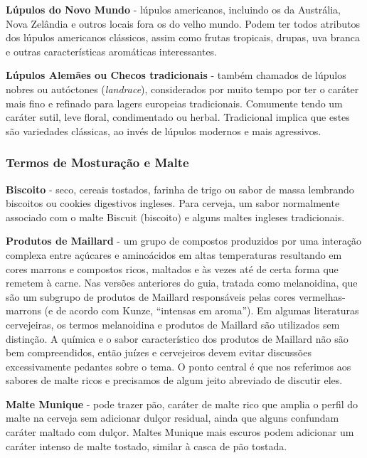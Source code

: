 \textbf{Lúpulos do Novo Mundo} - lúpulos americanos, incluindo os da Austrália, Nova Zelândia e outros locais fora os do velho mundo. Podem ter todos atributos dos lúpulos americanos clássicos, assim como frutas tropicais, drupas, uva branca e outras características aromáticas interessantes.

\textbf{Lúpulos Alemães ou Checos tradicionais} - também chamados de lúpulos nobres ou autóctones (\textit{landrace}), considerados por muito tempo por ter o caráter mais fino e refinado para lagers europeias tradicionais. Comumente tendo um caráter sutil, leve floral, condimentado ou herbal. Tradicional implica que estes são variedades clássicas, ao invés de lúpulos modernos e mais agressivos.

\subsubsection*{Termos de Mosturação e Malte}

\textbf{Biscoito} - seco, cereais tostados, farinha de trigo ou sabor de massa lembrando biscoitos ou cookies digestivos ingleses. Para cerveja, um sabor normalmente associado com o malte Biscuit (biscoito) e alguns maltes ingleses tradicionais.

\textbf{Produtos de Maillard} - um grupo de compostos produzidos por uma interação complexa entre açúcares e aminoácidos em altas temperaturas resultando em cores marrons e compostos ricos, maltados e às vezes até de certa forma que remetem à carne. Nas versões anteriores do guia, tratada como melanoidina, que são um subgrupo de produtos de Maillard responsáveis pelas cores vermelhas-marrons (e de acordo com Kunze, “intensas em aroma”). Em algumas literaturas cervejeiras, os termos melanoidina e produtos de Maillard são utilizados sem distinção. A química e o sabor característico dos produtos de Maillard não são bem compreendidos, então juízes e cervejeiros devem evitar discussões excessivamente pedantes sobre o tema. O ponto central é que nos referimos aos sabores de malte ricos e precisamos de algum jeito abreviado de discutir eles.

\textbf{Malte Munique} - pode trazer pão, caráter de malte rico que amplia o perfil do malte na cerveja sem adicionar dulçor residual, ainda que alguns confundam caráter maltado com dulçor. Maltes Munique mais escuros podem adicionar um caráter intenso de malte tostado, similar à casca de pão tostada.

